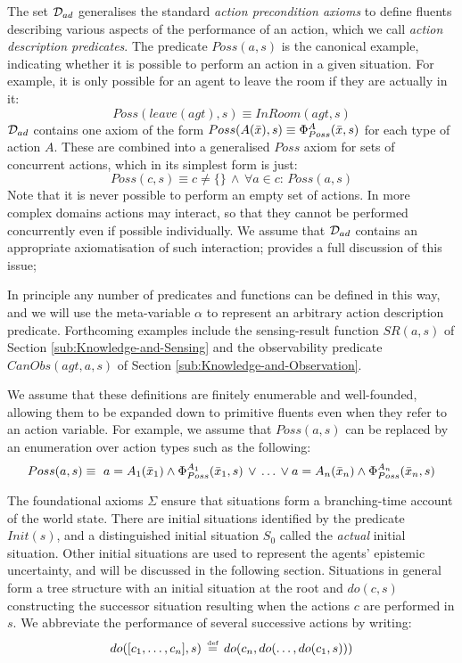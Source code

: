 \medskip{}


The set $\mathcal{D}_{ad}$ generalises the standard \emph{action precondition
axioms} \citet{pirri99contributions_sitcalc} to define fluents describing
various aspects of the performance of an action, which we call \emph{action
description predicates}. The predicate $Poss(a,s)$ is the canonical
example, indicating whether it is possible to perform an action in
a given situation. For example, it is only possible for an agent to
leave the room if they are actually in it:\[
Poss(leave(agt),s)\equiv InRoom(agt,s)\]
 $\mathcal{D}_{ad}$ contains one axiom of the form $Poss(A(\bar{x}),s)\equiv\Phi_{Poss}^{A}(\bar{x},s)$
for each type of action $A$. These are combined into a generalised
$Poss$ axiom for sets of concurrent actions, which in its simplest
form is just:\[
Poss(c,s)\equiv c\neq\{\}\,\wedge\,\forall a\in c:\, Poss(a,s)\]
 Note that it is never possible to perform an empty set of actions.
In more complex domains actions may interact, so that they cannot
be performed concurrently even if possible individually. We assume
that $\mathcal{D}_{ad}$ contains an appropriate axiomatisation of such interaction;
\citet{pinto94temporal} provides a full discussion of this issue;

In principle any number of predicates and functions can be defined
in this way, and we will use the meta-variable $\alpha$ to represent
an arbitrary action description predicate. Forthcoming examples include
the sensing-result function $SR(a,s)$ of Section \ref{sub:Knowledge-and-Sensing}
and the observability predicate $CanObs(agt,a,s)$ of Section \ref{sub:Knowledge-and-Observation}.

We assume that these definitions are finitely enumerable and well-founded,
allowing them to be expanded down to primitive fluents even when they
refer to an action variable. For example, we assume that $Poss(a,s)$
can be replaced by an enumeration over action types such as the following:\[
Poss(a,s)\equiv\,\, a=A_{1}(\bar{x}_{1})\wedge\Phi_{Poss}^{A_{1}}(\bar{x}_{1},s)\,\vee\,\dots\,\vee a=A_{n}(\bar{x}_{n})\wedge\Phi_{Poss}^{A_{n}}(\bar{x}_{n},s)\]


\medskip{}


The foundational axioms $\Sigma$ ensure that situations form a branching-time
account of the world state. There are initial situations identified
by the predicate $Init(s)$, and a distinguished initial situation
$S_{0}$ called the \emph{actual} initial situation. Other initial
situations are used to represent the agents' epistemic uncertainty,
and will be discussed in the following section. Situations in general
form a tree structure with an initial situation at the root and $do(c,s)$
constructing the successor situation resulting when the actions $c$
are performed in $s$. We abbreviate the performance of several successive
actions by writing:\[
do([c_{1},\dots,c_{n}],s)\,\stackrel{\mbox{\tiny def}}{=}\, do(c_{n},do(\dots,do(c_{1},s)))\]


